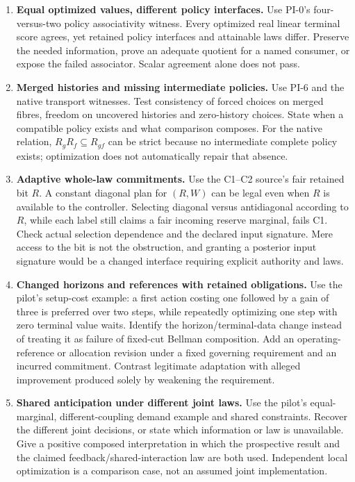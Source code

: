 \documentclass[11pt]{article}
\begin{document}
\begin{enumerate}[label=\textbf{D\arabic*.}]
\item \textbf{Equal optimized values, different policy interfaces.}
Use PI-0's four-versus-two policy associativity witness. Every optimized real linear terminal score agrees, yet retained policy interfaces and attainable laws differ. Preserve the needed information, prove an adequate quotient for a named consumer, or expose the failed associator. Scalar agreement alone does not pass.

\item \textbf{Merged histories and missing intermediate policies.}
Use PI-6 and the native transport witnesses. Test consistency of forced choices on merged fibres, freedom on uncovered histories and zero-history choices. State when a compatible policy exists and what comparison composes. For the native relation, \(R_gR_f\subseteq R_{gf}\) can be strict because no intermediate complete policy exists; optimization does not automatically repair that absence.

\item \textbf{Adaptive whole-law commitments.}
Use the C1--C2 source's fair retained bit \(R\). A constant diagonal plan for \((R,W)\) can be legal even when \(R\) is available to the controller. Selecting diagonal versus antidiagonal according to \(R\), while each label still claims a fair incoming reserve marginal, fails C1. Check actual selection dependence and the declared input signature. Mere access to the bit is not the obstruction, and granting a posterior input signature would be a changed interface requiring explicit authority and laws.

\item \textbf{Changed horizons and references with retained obligations.}
Use the pilot's setup-cost example: a first action costing one followed by a gain of three is preferred over two steps, while repeatedly optimizing one step with zero terminal value waits. Identify the horizon/terminal-data change instead of treating it as failure of fixed-cut Bellman composition. Add an operating-reference or allocation revision under a fixed governing requirement and an incurred commitment. Contrast legitimate adaptation with alleged improvement produced solely by weakening the requirement.

\item \textbf{Shared anticipation under different joint laws.}
Use the pilot's equal-marginal, different-coupling demand example and shared constraints. Recover the different joint decisions, or state which information or law is unavailable. Give a positive composed interpretation in which the prospective result and the claimed feedback/shared-interaction law are both used. Independent local optimization is a comparison case, not an assumed joint implementation.
\end{enumerate}
\end{document}
